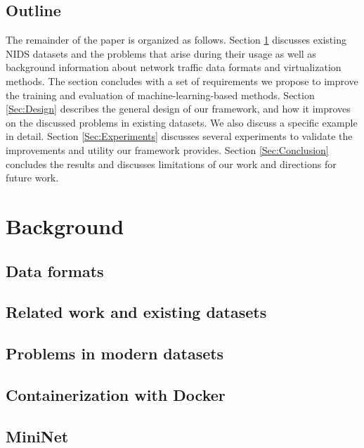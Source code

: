 \documentclass[sigconf]{acmart}
\begin{document}
\subsection{Outline}

The remainder of the paper is organized as follows. Section \ref{Sec:background} discusses existing NIDS datasets and the problems that arise during their usage as well as background information about network traffic data formats and virtualization methods. The section concludes with a set of requirements we propose to improve the training and evaluation of machine-learning-based methods. Section \ref{Sec:Design} describes the general design of our framework, and how it improves on the discussed problems in existing datasets. We also discuss a specific example in detail. Section \ref{Sec:Experiments} discusses several experiments to validate the improvements and utility our framework provides. 
Section \ref{Sec:Conclusion} concludes the results and discusses limitations of our work and directions for future work.


\section{Background}\label{Sec:background}

\subsection{Data formats}

\subsection{Related work and existing datasets}




\subsection{Problems in modern datasets}\label{Sec:problems}



\subsection{Containerization with Docker}

\subsection{MiniNet}
\end{document}
